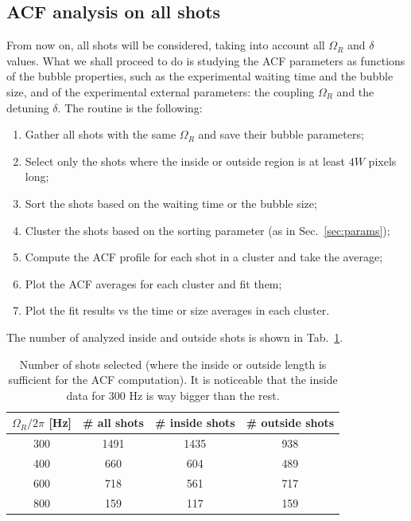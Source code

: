 \subsection{ACF analysis on all shots}
From now on, all shots will be considered, taking into account all $\Omega_R$ and $\delta$ values. What we shall proceed to do is studying the ACF parameters as functions of the bubble properties, such as the experimental waiting time and the bubble size, and of the experimental external parameters: the coupling $\Omega_R$ and the detuning $\delta$. 
The routine is the following:
\begin{enumerate}
    \item Gather all shots with the same $\Omega_R$ and save their bubble parameters;
    \item Select only the shots where the inside or outside region is at least $4W$ pixels long;
    \item Sort the shots based on the waiting time or the bubble size;
    \item Cluster the shots based on the sorting parameter (as in Sec.\ \ref{sec:params});
    \item Compute the ACF profile for each shot in a cluster and take the average;
    \item Plot the ACF averages for each cluster and fit them;
    \item Plot the fit results vs the time or size averages in each cluster.
\end{enumerate}
The number of analyzed inside and outside shots is shown in Tab.\ \ref{tab:shots}.
\begin{table}[h!]
    \centering
    \begin{tabular}{c|c|c|c}
        $\Omega_R/2\pi$ [\unit{\hertz}] & \# all shots & \# inside shots & \# outside shots \\
        \hline
        300 & 1491 & 1435 & 938\\   
        400 & 660 & 604 & 489\\
        600 & 718 & 561 & 717\\
        800 & 159 & 117 & 159\\     
    \end{tabular}
    \caption{Number of shots selected (where the inside or outside length is sufficient for the ACF computation). It is noticeable that the inside data for 300 \unit{\hertz} is way bigger than the rest.}
    \label{tab:shots}
\end{table}

